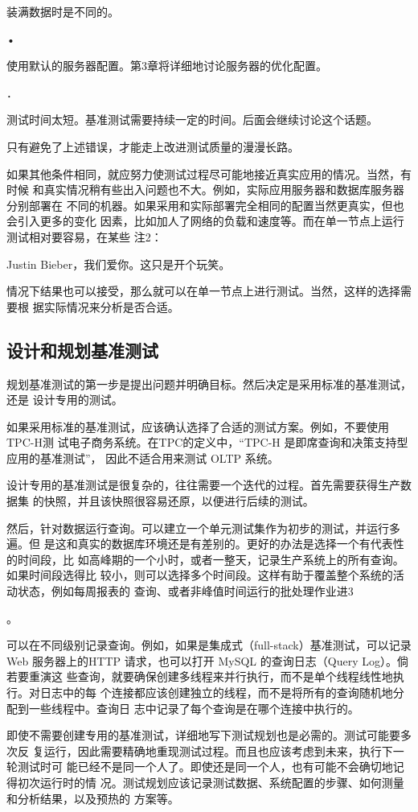 装满数据时是不同的。

•

使用默认的服务器配置。第3章将详细地讨论服务器的优化配置。

．

测试时间太短。基准测试需要持续一定的时间。后面会继续讨论这个话题。

只有避免了上述错误，才能走上改进测试质量的漫漫长路。

如果其他条件相同，就应努力使测试过程尽可能地接近真实应用的情况。当然，有时候
和真实情况稍有些出入问题也不大。例如，实际应用服务器和数据库服务器分别部署在
不同的机器。如果采用和实际部署完全相同的配置当然更真实，但也会引入更多的变化
因素，比如加人了网络的负载和速度等。而在单一节点上运行测试相对要容易，在某些
注2：

Justin Bieber，我们爱你。这只是开个玩笑。

情况下结果也可以接受，那么就可以在单一节点上进行测试。当然，这样的选择需要根
据实际情况来分析是否合适。

\subsection{设计和规划基准测试}
规划基准测试的第一步是提出问题并明确目标。然后决定是采用标准的基准测试，还是
设计专用的测试。

如果采用标准的基准测试，应该确认选择了合适的测试方案。例如，不要使用TPC-H测
试电子商务系统。在TPC的定义中，“TPC-H 是即席查询和决策支持型应用的基准测试”，
因此不适合用来测试 OLTP 系统。

设计专用的基准测试是很复杂的，往往需要一个迭代的过程。首先需要获得生产数据集
的快照，并且该快照很容易还原，以便进行后续的测试。

然后，针对数据运行查询。可以建立一个单元测试集作为初步的测试，并运行多遍。但
是这和真实的数据库环境还是有差别的。更好的办法是选择一个有代表性的时间段，比
如高峰期的一个小时，或者一整天，记录生产系统上的所有查询。如果时间段选得比
较小，则可以选择多个时间段。这样有助于覆盖整个系统的活动状态，例如每周报表的
查询、或者非峰值时间运行的批处理作业进3

。

可以在不同级别记录查询。例如，如果是集成式（full-stack）基准测试，可以记录 Web
服务器上的HTTP 请求，也可以打开 MySQL 的查询日志（Query Log）。倘若要重演这
些查询，就要确保创建多线程来并行执行，而不是单个线程线性地执行。对日志中的每
个连接都应该创建独立的线程，而不是将所有的查询随机地分配到一些线程中。查询日
志中记录了每个查询是在哪个连接中执行的。

即使不需要创建专用的基准测试，详细地写下测试规划也是必需的。测试可能要多次反
复运行，因此需要精确地重现测试过程。而且也应该考虑到未来，执行下一轮测试时可
能已经不是同一个人了。即使还是同一个人，也有可能不会确切地记得初次运行时的情
况。测试规划应该记录测试数据、系统配置的步骤、如何测量和分析结果，以及预热的
方案等。

